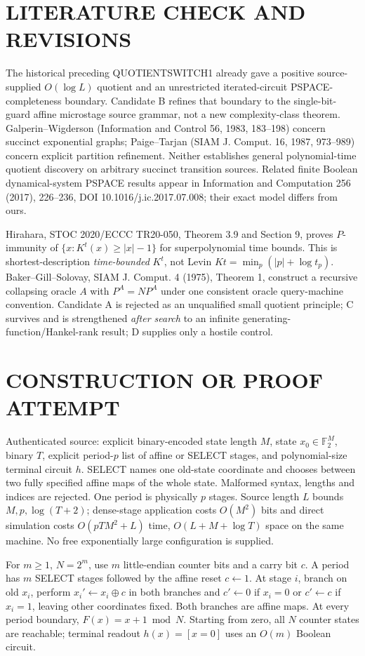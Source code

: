 \documentclass[11pt]{article}
\begin{document}
\section{LITERATURE CHECK AND REVISIONS}
The historical preceding QUOTIENTSWITCH1 already gave a positive source-supplied $O(\log L)$ quotient and an unrestricted iterated-circuit PSPACE-completeness boundary. Candidate B refines that boundary to the single-bit-guard affine microstage source grammar, not a new complexity-class theorem. Galperin--Wigderson (Information and Control 56, 1983, 183--198) concern succinct exponential graphs; Paige--Tarjan (SIAM J. Comput. 16, 1987, 973--989) concern explicit partition refinement. Neither establishes general polynomial-time quotient discovery on arbitrary succinct transition sources. Related finite Boolean dynamical-system PSPACE results appear in Information and Computation 256 (2017), 226--236, DOI 10.1016/j.ic.2017.07.008; their exact model differs from ours.
\par Hirahara, STOC 2020/ECCC TR20-050, Theorem 3.9 and Section 9, proves $P$-immunity of $\{x:K^t(x)\ge |x|-1\}$ for superpolynomial time bounds. This is shortest-description \emph{time-bounded} $K^t$, not Levin $Kt=\min_p(|p|+\log t_p)$. Baker--Gill--Solovay, SIAM J. Comput. 4 (1975), Theorem 1, construct a recursive collapsing oracle $A$ with $P^A=NP^A$ under one consistent oracle query-machine convention. Candidate A is rejected as an unqualified small quotient principle; C survives and is strengthened \emph{after search} to an infinite generating-function/Hankel-rank result; D supplies only a hostile control.

\section{CONSTRUCTION OR PROOF ATTEMPT}
Authenticated source: explicit binary-encoded state length $M$, state $x_0\in\mathbb F_2^M$, binary $T$, explicit period-$p$ list of affine or SELECT stages, and polynomial-size terminal circuit $h$. SELECT names one old-state coordinate and chooses between two fully specified affine maps of the whole state. Malformed syntax, lengths and indices are rejected. One period is physically $p$ stages. Source length $L$ bounds $M,p,\log(T+2)$; dense-stage application costs $O(M^2)$ bits and direct simulation costs $O(pTM^2+L)$ time, $O(L+M+\log T)$ space on the same machine. No free exponentially large configuration is supplied.

For $m\ge1$, $N=2^m$, use $m$ little-endian counter bits and a carry bit $c$. A period has $m$ SELECT stages followed by the affine reset $c\leftarrow1$. At stage $i$, branch on old $x_i$, perform $x_i'\leftarrow x_i\oplus c$ in both branches and $c'\leftarrow0$ if $x_i=0$ or $c'\leftarrow c$ if $x_i=1$, leaving other coordinates fixed. Both branches are affine maps. At every period boundary, $F(x)=x+1\bmod N$. Starting from zero, all $N$ counter states are reachable; terminal readout $h(x)=[x=0]$ uses an $O(m)$ Boolean circuit.
\end{document}
